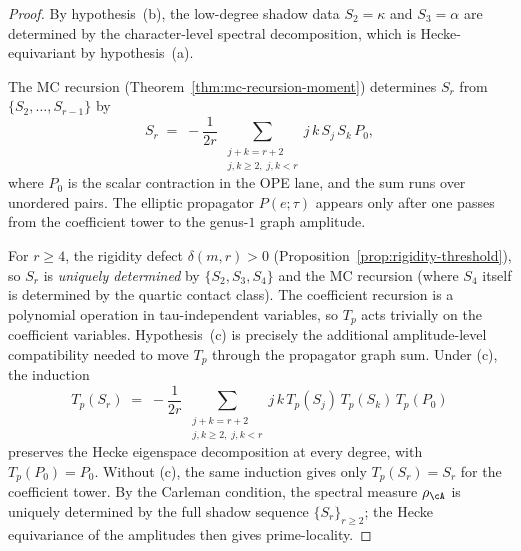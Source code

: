 \begin{proof}
By hypothesis~(b), the low-degree shadow data
$S_2 = \kappa$ and $S_3 = \alpha$ are determined by the
character-level spectral decomposition, which is
Hecke-equivariant by hypothesis~(a).

The MC recursion
(Theorem~\ref{thm:mc-recursion-moment})
determines $S_r$ from $\{S_2, \ldots, S_{r-1}\}$ by
\[
 S_r
 \;=\;
 -\frac{1}{2r}\;
 \sum_{\substack{j + k = r+2 \\ j,k \ge 2,\; j,k < r}}
 j\,k\,S_j\,S_k\,P_0,
\]
where $P_0$ is the scalar contraction in the OPE lane, and the sum
runs over unordered pairs. The elliptic propagator $P(e;\tau)$ appears
only after one passes from the coefficient tower to the genus-$1$ graph
amplitude.

For $r \ge 4$, the rigidity defect $\delta(m,r) > 0$
(Proposition~\ref{prop:rigidity-threshold}), so $S_r$ is
\emph{uniquely determined} by $\{S_2, S_3, S_4\}$ and the MC
recursion (where $S_4$ itself is determined by the
quartic contact class). The coefficient recursion is a polynomial
operation in tau-independent variables, so $T_p$ acts trivially on
the coefficient variables. Hypothesis~\textup{(c)} is precisely the
additional amplitude-level compatibility needed to move $T_p$
through the propagator graph sum. Under \textup{(c)}, the induction
\[
 T_p(S_r)
 \;=\;
 -\frac{1}{2r}\;
 \sum_{\substack{j+k=r+2\\j,k\ge 2,\; j,k<r}}
 j\,k\,T_p(S_j)\,T_p(S_k)\,T_p(P_0)
\]
preserves the Hecke eigenspace decomposition at every
degree, with $T_p(P_0)=P_0$. Without \textup{(c)}, the same induction gives only
$T_p(S_r)=S_r$ for the coefficient tower. By the Carleman condition,
the spectral measure
$\rho_\cA$ is uniquely determined by the full shadow
sequence $\{S_r\}_{r \ge 2}$; the Hecke equivariance of
the amplitudes then gives prime-locality.
\end{proof}

